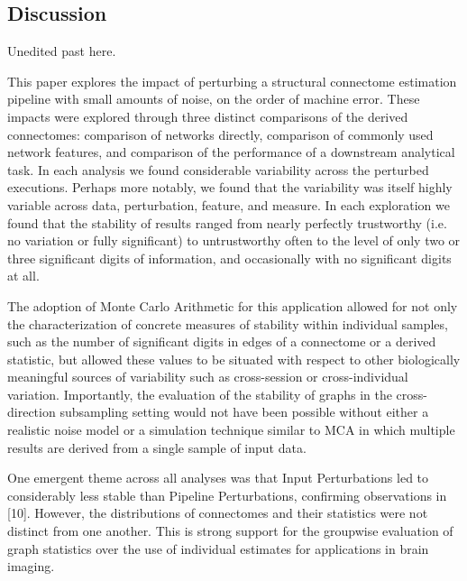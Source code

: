 \documentclass[fleqn,10pt]{SelfArx} %
\begin{document}
\subsection*{Discussion}

{\color{red} Unedited past here}.

This paper explores the impact of perturbing a structural connectome estimation pipeline with small amounts of noise,
on the order of machine error. These impacts were explored through three distinct comparisons of the derived
connectomes: comparison of networks directly, comparison of commonly used network features, and comparison of the
performance of a downstream analytical task. In each analysis we found considerable variability across the perturbed
executions. Perhaps more notably, we found that the variability was itself highly variable across data, perturbation,
feature, and measure. In each exploration we found that the stability of results ranged from nearly perfectly
trustworthy (i.e. no variation or fully significant) to untrustworthy often to the level of only two or three
significant digits of information, and occasionally with no significant digits at all.

The adoption of Monte Carlo Arithmetic for this application allowed for not only the characterization of concrete
measures of stability within individual samples, such as the number of significant digits in edges of a connectome or a
derived statistic, but allowed these values to be situated with respect to other biologically meaningful sources of
variability such as cross-session or cross-individual variation. Importantly, the evaluation of the stability of graphs
in the cross-direction subsampling setting would not have been possible without either a realistic noise model or a
simulation technique similar to MCA in which multiple results are derived from a single sample of input data.

One emergent theme across all analyses was that Input Perturbations led to considerably less stable than Pipeline
Perturbations, confirming observations in [10]. However, the distributions of connectomes and their statistics were not
distinct from one another. This is strong support for the groupwise evaluation of graph statistics over the use of
individual estimates for applications in brain imaging.
\end{document}

